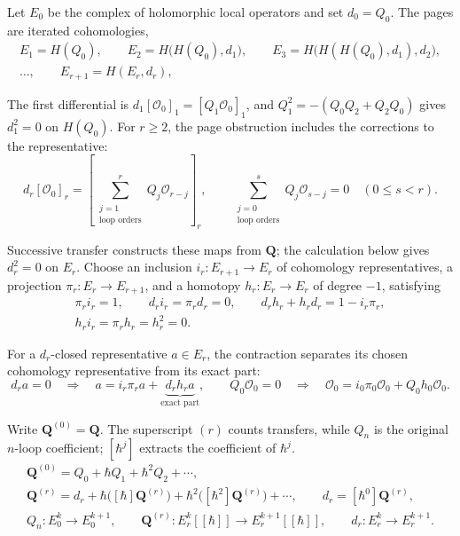 \documentclass[11pt]{article}
\numberwithin{equation}{section}
\numberwithin{figure}{section}
\numberwithin{table}{section}
\begin{document}
Let $E_0$ be the complex of holomorphic local operators and set $d_0=Q_0$. The pages are iterated cohomologies,
\begin{equation}\label{eq-page-iterated}
\begin{gathered}
E_1=H(Q_0),\qquad
E_2=H\bigl(H(Q_0),d_1\bigr),\qquad
E_3=H\bigl(H(H(Q_0),d_1),d_2\bigr),\\
\ldots,\qquad
E_{r+1}=H(E_r,d_r),
\end{gathered}
\end{equation}

The first differential is $d_1[\mathcal O_0]_1=[Q_1\mathcal O_0]_1$, and $Q_1^2=-(Q_0Q_2+Q_2Q_0)$ gives $d_1^2=0$ on $H(Q_0)$. For $r\ge2$, the page obstruction includes the corrections to the representative:
\begin{equation}\label{local-ch8-obstruction-definition}
d_r[\mathcal O_0]_r=
\left[\sum_{\substack{j=1\\\text{loop orders}}}^{r}Q_j\mathcal O_{r-j}\right]_r,
\qquad
\sum_{\substack{j=0\\\text{loop orders}}}^{s}Q_j\mathcal O_{s-j}=0\quad(0\le s<r).
\end{equation}

Successive transfer constructs these maps from $\mathbf Q$; the calculation below gives $d_r^2=0$ on $E_r$. Choose an inclusion $i_r:E_{r+1}\to E_r$ of cohomology representatives, a projection $\pi_r:E_r\to E_{r+1}$, and a homotopy $h_r:E_r\to E_r$ of degree $-1$, satisfying
\begin{equation}\label{eq-page-contraction}
\begin{gathered}
\pi_ri_r=1,\qquad d_ri_r=\pi_rd_r=0,\qquad
d_rh_r+h_rd_r=1-i_r\pi_r,\\
h_ri_r=\pi_rh_r=h_r^2=0.
\end{gathered}
\end{equation}

For a $d_r$-closed representative $a\in E_r$, the contraction separates its chosen cohomology representative from its exact part:
\begin{equation}\label{local-ch8-representative-decomposition}
d_ra=0
\quad\Longrightarrow\quad
a=i_r\pi_ra+\underbrace{d_rh_ra}_{\text{exact part}},
\qquad
Q_0\mathcal O_0=0
\quad\Longrightarrow\quad
\mathcal O_0=i_0\pi_0\mathcal O_0+Q_0h_0\mathcal O_0.
\end{equation}

Write $\mathbf Q^{(0)}=\mathbf Q$. The superscript $(r)$ counts transfers, while $Q_n$ is the original $n$-loop coefficient; $[\hbar^j]$ extracts the coefficient of $\hbar^j$.
\begin{equation}\label{local-f6c8e4e4-0aee-4848-9206-eb392052b047}
\begin{gathered}
\mathbf Q^{(0)}=Q_0+\hbar Q_1+\hbar^2Q_2+\cdots,\\
\mathbf Q^{(r)}=d_r+\hbar\bigl([\hbar]\mathbf Q^{(r)}\bigr)
+\hbar^2\bigl([\hbar^2]\mathbf Q^{(r)}\bigr)+\cdots,
\qquad d_r=[\hbar^0]\mathbf Q^{(r)},\\
Q_n:E_0^k\to E_0^{k+1},\qquad
\mathbf Q^{(r)}:E_r^k[[\hbar]]\to E_r^{k+1}[[\hbar]],\qquad
d_r:E_r^k\to E_r^{k+1}.
\end{gathered}
\end{equation}
\end{document}
